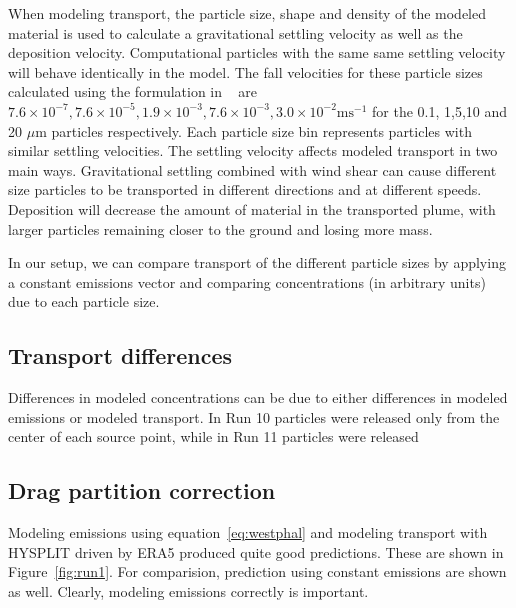 
When modeling transport, the particle size, shape and density of the modeled material is used to calculate a gravitational settling velocity as well as the deposition velocity.
Computational particles with the same same settling velocity will behave identically in the model. 
The fall velocities for these particle sizes calculated using the formulation in ~\cite{Ganser} are 
$7.6\times 10^{-7}, 7.6\times10^{-5}, 1.9\times10^{-3}, 7.6\times10^{-3}, 3.0\times10^{-2} \mathrm{m}\mathrm{s}^{-1}$ for the 0.1, 1,5,10 and 20 $\mu\mathrm{m}$ particles respectively. 
Each particle size bin represents particles with similar settling velocities. 
The settling velocity affects modeled transport in
two main ways. Gravitational settling combined with wind
shear can cause different size particles to be transported in different directions and at different speeds. 
Deposition will decrease the amount of material in the transported plume, with larger particles remaining closer to the ground and losing more mass.

In our setup, we can compare transport of the different particle sizes by applying a constant emissions vector and comparing concentrations (in arbitrary units) due to each
particle size. 

\subsection{Transport differences}

Differences in modeled concentrations can be due to either differences in modeled emissions or modeled transport. 
In Run 10 particles were released only from the center of each source point, while in Run 11 particles were released 

\subsection{Drag partition correction}

Modeling emissions using equation~\ref{eq:westphal} and modeling transport with HYSPLIT driven by ERA5 produced quite good predictions. These are shown in Figure~\ref{fig:run1}.
For comparision, prediction using constant emissions are shown as well. Clearly, modeling emissions correctly is important.

